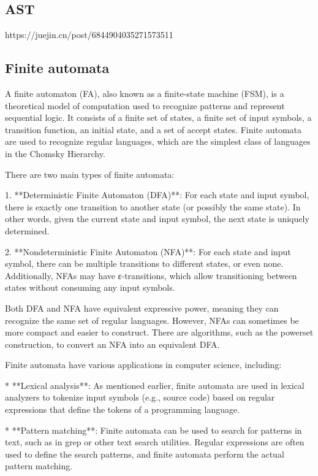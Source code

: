 \documentclass{article}
\begin{document}
\subsection{AST}

https://juejin.cn/post/6844904035271573511


\subsection{Finite automata}

A finite automaton (FA), also known as a finite-state machine (FSM), is a theoretical model of computation used to recognize patterns and represent sequential logic. It consists of a finite set of states, a finite set of input symbols, a transition function, an initial state, and a set of accept states. Finite automata are used to recognize regular languages, which are the simplest class of languages in the Chomsky Hierarchy.

There are two main types of finite automata:

1. **Deterministic Finite Automaton (DFA)**: For each state and input symbol, there is exactly one transition to another state (or possibly the same state). In other words, given the current state and input symbol, the next state is uniquely determined.

2. **Nondeterministic Finite Automaton (NFA)**: For each state and input symbol, there can be multiple transitions to different states, or even none. Additionally, NFAs may have ε-transitions, which allow transitioning between states without consuming any input symbols.

Both DFA and NFA have equivalent expressive power, meaning they can recognize the same set of regular languages. However, NFAs can sometimes be more compact and easier to construct. There are algorithms, such as the powerset construction, to convert an NFA into an equivalent DFA.

Finite automata have various applications in computer science, including:

* **Lexical analysis**: As mentioned earlier, finite automata are used in lexical analyzers to tokenize input symbols (e.g., source code) based on regular expressions that define the tokens of a programming language.

* **Pattern matching**: Finite automata can be used to search for patterns in text, such as in grep or other text search utilities. Regular expressions are often used to define the search patterns, and finite automata perform the actual pattern matching.
\end{document}
